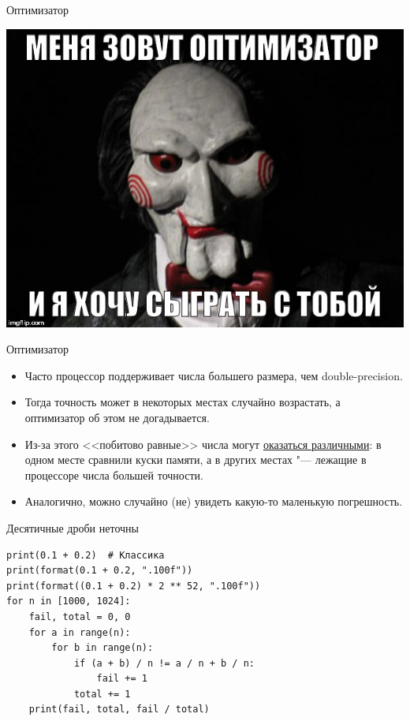 \begin{frame}{Оптимизатор}
	\begin{center}
		\includegraphics[scale=0.4]{optimizer-game.jpg}
	\end{center}
\end{frame}

\begin{frame}{Оптимизатор}
	\begin{itemize}
		\item
			Часто процессор поддерживает числа большего размера, чем double-precision.
		\item
			Тогда точность может в некоторых местах случайно возрастать, а оптимизатор об этом не догадывается.
		\item
			Из-за этого <<побитово равные>> числа могут \href{http://codeforces.com/blog/entry/1059}{оказаться различными}:
			в одном месте сравнили куски памяти, а в других местах "--- лежащие в процессоре числа большей точности.
		\item
			Аналогично, можно случайно (не) увидеть какую-то маленькую погрешность.
	\end{itemize}
\end{frame}

\begin{frame}[fragile]{Десятичные дроби неточны}
\begin{verbatim}
print(0.1 + 0.2)  # Классика
print(format(0.1 + 0.2, ".100f"))
print(format((0.1 + 0.2) * 2 ** 52, ".100f"))
for n in [1000, 1024]:
    fail, total = 0, 0
    for a in range(n):
        for b in range(n):
            if (a + b) / n != a / n + b / n:
                fail += 1
            total += 1
    print(fail, total, fail / total)
\end{verbatim}
\end{frame}

